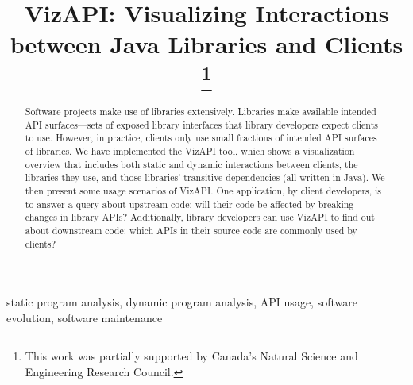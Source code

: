 \documentclass[conference]{IEEEtran}
\begin{document}
\title{VizAPI: Visualizing Interactions between Java Libraries and Clients
\thanks{This work was partially supported by Canada's Natural Science and Engineering Research Council.}
}

\author{
\and
{}
}

\maketitle

\begin{abstract}
Software projects make use of libraries extensively. Libraries make available intended API surfaces—sets of exposed library interfaces that library developers expect clients to use. However, in practice, clients only use small fractions of intended API surfaces of libraries. We have implemented the VizAPI tool, which shows a visualization overview that includes both static and dynamic interactions between clients, the libraries they use, and  those libraries’ transitive dependencies (all written in Java). We then present some usage scenarios of VizAPI. One application, by client developers, is to answer a query about upstream code: will their code be affected by breaking changes in library APIs? Additionally, library developers can use VizAPI to find out about downstream code: which APIs in their source code are commonly used by clients? 
\end{abstract}

\begin{IEEEkeywords}
static program analysis,
dynamic program analysis,
API usage,
software evolution,
software maintenance
\end{IEEEkeywords}
\end{document}
